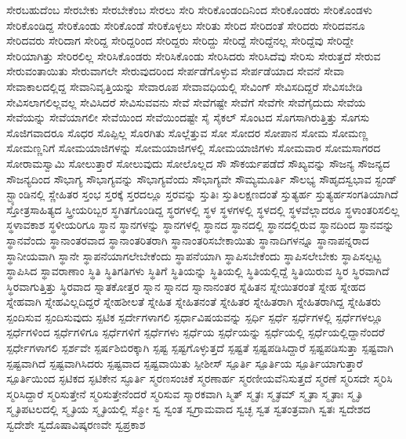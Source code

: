 {ಸೇರಬಹುದೆಂಬ
ಸೇರಬೇಕು
ಸೇರಬೇಕೆಂಬ
ಸೇರಲು
ಸೇರಿ
ಸೇರಿಕೊಂಡಂದಿನಿಂದ
ಸೇರಿಕೊಂಡರು
ಸೇರಿಕೊಂಡಳು
ಸೇರಿಕೊಂಡಿದ್ದ
ಸೇರಿಕೊಂಡು
ಸೇರಿಕೊಂಡೆ
ಸೇರಿಕೊಳ್ಳಲು
ಸೇರಿತು
ಸೇರಿದ
ಸೇರಿದಂತೆ
ಸೇರಿದರು
ಸೇರಿದವನೂ
ಸೇರಿದವರು
ಸೇರಿದಾಗ
ಸೇರಿದ್ದ
ಸೇರಿದ್ದರಿಂದ
ಸೇರಿದ್ದರು
ಸೇರಿದ್ದು
ಸೇರಿದ್ದೆ
ಸೇರಿದ್ದೆನಲ್ಲ
ಸೇರಿದ್ದೆವು
ಸೇರಿದ್ದೇ
ಸೇರಿಯಾಗಿತ್ತು
ಸೇರಿರಲಿಲ್ಲ
ಸೇರಿಸಿಕೊಂಡರು
ಸೇರಿಸಿಕೊಂಡು
ಸೇರಿಸಿದರು
ಸೇರಿಸಿದೆವು
ಸೇರಿಸು
ಸೇರುತ್ತದೆ
ಸೇರುವ
ಸೇರುವಂತಾಯಿತು
ಸೇರುವಾಗಲೇ
ಸೇರುವುದರಿಂದ
ಸೇರ್ಪಡೆಗೊಳ್ಳುವ
ಸೇರ್ಪಡೆಯಾದ
ಸೇವನೆ
ಸೇವಾ
ಸೇವಾಕಾಲದಲ್ಲಿದ್ದ
ಸೇವಾನಿವೃತ್ತಿಯನ್ನು
ಸೇವಾರೂಪ
ಸೇವಾವಧಿಯಲ್ಲಿ
ಸೇವಿಂಗ್
ಸೇವಿಸದಿದ್ದರೆ
ಸೇವಿಸಬೇಡಿ
ಸೇವಿಸಲಾಗಲಿಲ್ಲವಲ್ಲ
ಸೇವಿಸಿದರೆ
ಸೇವಿಸುವವನು
ಸೇವೆ
ಸೇವೆಗಷ್ಟೇ
ಸೇವೆಗೆ
ಸೇವೆಗೇ
ಸೇವೆಗೈದುದು
ಸೇವೆಯ
ಸೇವೆಯನ್ನು
ಸೇವೆಯಾಗಲೀ
ಸೇವೆಯಿಂದ
ಸೇವೆಯಿಂದಷ್ಟೇ
ಸೈ
ಸೈಕಲ್
ಸೊಂಟದ
ಸೊಗಸಾಗಿರುತ್ತಿತ್ತು
ಸೊಗಸು
ಸೊಜಿಗವಾದರೂ
ಸೊಧರ
ಸೊಪ್ಪಿಲ್ಲ
ಸೊರಗಿತು
ಸೊಲ್ಲೆತ್ತುವ
ಸೋ
ಸೋದರ
ಸೋಪಾನ
ಸೋಮ
ಸೋಮಣ್ಣ
ಸೋಮಣ್ಣನಿಗೆ
ಸೋಮಯಾಜಿಗಳನ್ನು
ಸೋಮಯಾಜಿಗಳಲ್ಲಿ
ಸೋಮಯಾಜಿಗಳು
ಸೋಮವಾರ
ಸೋಮಸಾಗರದ
ಸೋರಾಮಸ್ವಾಮಿ
ಸೋಲುತ್ತಾರೆ
ಸೋಲುವುದು
ಸೋಲೊಲ್ಲದ
ಸೌ
ಸೌಕರ್ಯಪಡೆದೆ
ಸೌಖ್ಯವನ್ನು
ಸೌಜನ್ಯ
ಸೌಜನ್ಯದ
ಸೌಜನ್ಯದಿಂದ
ಸೌಭಾಗ್ಯ
ಸೌಭಾಗ್ಯವನ್ನು
ಸೌಭಾಗ್ಯವೆಂದು
ಸೌಭಾಗ್ಯವೇ
ಸೌಮ್ಯಮೂರ್ತಿ
ಸೌಲಭ್ಯ
ಸೌಹೃದಸ್ವಭಾವ
ಸ್ಟಂಡ್
ಸ್ಟ್ಯಾಂಡಿನಲ್ಲಿ
ಸ್ಣೇಹಿತರ
ಸ್ತಂಭ
ಸ್ತರಕ್ಕೆ
ಸ್ತರದಲ್ಲೂ
ಸ್ತರವನ್ನು
ಸ್ತುತಿಃ
ಸ್ತುತಿಲಕ್ಷಣದಂತೆ
ಸ್ತುತ್ಯರ್ಹ
ಸ್ತುತ್ಯರ್ಹಸಂಗತಿಯಾಗಿದೆ
ಸ್ತೋತ್ರಸಾಹಿತ್ಯದ
ಸ್ತ್ರೀಯರಿಬ್ಬರ
ಸ್ಥಗಿತಗೊಂಡಿದ್ದ
ಸ್ಥರಗಳಲ್ಲಿ
ಸ್ಥಳ
ಸ್ಥಳಗಳಲ್ಲಿ
ಸ್ಥಳದಲ್ಲಿ
ಸ್ಥಳವೆಲ್ಲಾದರೂ
ಸ್ಥಳಾಂತರಿಸಲಿಲ್ಲ
ಸ್ಥಳಾವಕಾಶ
ಸ್ಥಳೀಯರಿಗೂ
ಸ್ಥಾನ
ಸ್ಥಾನಗಳನ್ನು
ಸ್ಥಾನಗಳಲ್ಲಿ
ಸ್ಥಾನದ
ಸ್ಥಾನದಲ್ಲಿ
ಸ್ಥಾನದಲ್ಲಿರುವ
ಸ್ಥಾನದಿಂದ
ಸ್ಥಾನವನ್ನು
ಸ್ಥಾನವೆಂದು
ಸ್ಥಾನಾಂತರವಾದ
ಸ್ಥಾನಾಂತರಿತರಾಗಿ
ಸ್ಥಾನಾಂತರಿಸಬೇಕಾಯಿತು
ಸ್ಥಾನಾದಿಗಳನ್ನೂ
ಸ್ಥಾನಾಪನ್ನರಾದ
ಸ್ಥಾನೀಯವಾಗಿ
ಸ್ಥಾನೇ
ಸ್ಥಾಪನೆಯಾಗಲೇಬೇಕೆಂದು
ಸ್ಥಾಪನೆಯಾಗಿ
ಸ್ಥಾಪಿಸಬೇಕೆಂದು
ಸ್ಥಾಪಿಸಲೇಬೇಕು
ಸ್ಥಾಪಿಸಲ್ಪಟ್ಟ
ಸ್ಥಾಪಿಸಿದ
ಸ್ಥಾವರಾಣಾಂ
ಸ್ಥಿತಿ
ಸ್ಥಿತಿಗತಿಗಳು
ಸ್ಥಿತಿಗೆ
ಸ್ಥಿತಿಯನ್ನು
ಸ್ಥಿತಿಯಲ್ಲಿ
ಸ್ಥಿತಿಯಲ್ಲಿದ್ದೆ
ಸ್ಥಿತಿಯಿರುವ
ಸ್ಥಿರ
ಸ್ಥಿರವಾಗಿದೆ
ಸ್ಥಿರವಾಗುತ್ತಿತ್ತು
ಸ್ಥಿರವಾದ
ಸ್ನಾತಕೋತ್ತರ
ಸ್ನಾನ
ಸ್ನಾನದ
ಸ್ನಾನಾನಂತರ
ಸ್ನೆಹಿತನ
ಸ್ನೇಯಿತರಂತೆ
ಸ್ನೇಹ
ಸ್ನೇಹದ
ಸ್ನೇಹವಾಗಿ
ಸ್ನೇಹವಿಲ್ಲದಿದ್ದರೆ
ಸ್ನೇಹಶೀಲತೆ
ಸ್ನೇಹಿತ
ಸ್ನೇಹಿತನಂತೆ
ಸ್ನೇಹಿತರ
ಸ್ನೇಹಿತರಾಗಿ
ಸ್ನೇಹಿತರಾಗಿದ್ದ
ಸ್ನೇಹಿತರು
ಸ್ಪಂದಿಸುವ
ಸ್ಪಂದಿಸುವುದು
ಸ್ಪಟಿಕ
ಸ್ಪರ್ದೇಗಳಾಗಲಿ
ಸ್ಪರ್ಧಾವಿಷಯವನ್ನು
ಸ್ಪರ್ಧಿ
ಸ್ಪರ್ಧೆ
ಸ್ಪರ್ಧೆಗಳಲ್ಲಿ
ಸ್ಪರ್ಧೆಗಳಲ್ಲೂ
ಸ್ಪರ್ಧೆಗಳಿಂದ
ಸ್ಪರ್ಧೆಗಳಿಗೂ
ಸ್ಪರ್ಧೆಗಳಿಗೆ
ಸ್ಪರ್ಧೆಗಳು
ಸ್ಪರ್ಧೆಯ
ಸ್ಪರ್ಧೆಯನ್ನು
ಸ್ಪರ್ಧೆಯಲ್ಲಿ
ಸ್ಪರ್ಧೆಯಲ್ಲಿದ್ದಾನೆಂದರೆ
ಸ್ಪರ್ಧೇಗಳಾಗಲಿ
ಸ್ಪರ್ಶವೇ
ಸ್ಪರ್ಷಶಿಬಿರಕ್ಕಾಗಿ
ಸ್ಪಷ್ಟ
ಸ್ಪಷ್ಟಗೊಳ್ಳುತ್ತದೆ
ಸ್ಪಷ್ಟತೆ
ಸ್ಪಷ್ಟಪಡಿಸಿದ್ದಾರೆ
ಸ್ಪಷ್ಟಪಡಿಸುತ್ತಾ
ಸ್ಪಷ್ಟವಾಗಿ
ಸ್ಪಷ್ಟವಾಗಿದೆ
ಸ್ಪಷ್ಟವಾಗಿಸಿದರು
ಸ್ಪಷ್ಟವಾದ
ಸ್ಪಷ್ಟವಾಯಿತು
ಸ್ಪೀಶೀಸ್
ಸ್ಪೂರ್ತಿ
ಸ್ಪೂರ್ತಿಯ
ಸ್ಪೂರ್ತಿಯಾಗುತ್ತಾರೆ
ಸ್ಪೂರ್ತಿಯಿಂದ
ಸ್ಫಟಿಕದ
ಸ್ಫಟಿಕೇನ
ಸ್ಫೂರ್ತಿ
ಸ್ಮರಣಸಂಚಿಕೆ
ಸ್ಮರಣಾರ್ಹ
ಸ್ಮರಣೀಯವೆನಿಸುತ್ತದೆ
ಸ್ಮರಣೆ
ಸ್ಮರಿಸದೇ
ಸ್ಮರಿಸಿ
ಸ್ಮರಿಸಿದ್ದಾರೆ
ಸ್ಮರಿಸುತ್ತೇನೆ
ಸ್ಮರಿಸುತ್ತೇನೆಂದರೆ
ಸ್ಮರಿಸುವ
ಸ್ಮಾರಕವಾಗಿ
ಸ್ಮಿತ್
ಸ್ಮೃತಃ
ಸ್ಮೃತಮ್
ಸ್ಮೃತಾ
ಸ್ಮೃತಾಃ
ಸ್ಮೃತಿ
ಸ್ಮೃತಿಪಟಲದಲ್ಲಿ
ಸ್ಮೃತಿಯ
ಸ್ಮೃತಿಯಲ್ಲಿ
ಸ್ಮೋ
ಸ್ವ
ಸ್ವಂತ
ಸ್ವಗ್ರಾಮವಾದ
ಸ್ವಚ್ಛ
ಸ್ವತ
ಸ್ವತಂತ್ರವಾಗಿ
ಸ್ವತಃ
ಸ್ವದೇಶದ
ಸ್ವದೇಶೇ
ಸ್ವದೊಷಾವಿಷ್ಕರಣವೇ
ಸ್ವಪ್ರಕಾಶ
}
